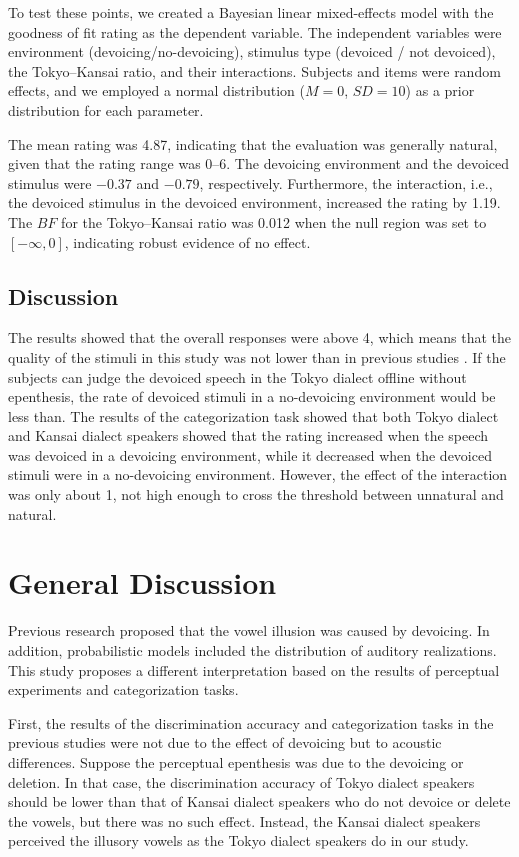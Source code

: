 \documentclass[a4paper,11pt,twocolumn]{article}
\begin{document}
To test these points, we created a Bayesian linear mixed-effects model with the goodness of fit rating as the dependent variable. The independent variables were environment (devoicing/no-devoicing), stimulus type (devoiced / not devoiced), the Tokyo--Kansai ratio, and their interactions. Subjects and items were random effects, and we employed a normal distribution ($M=0$, $SD=10$) as a prior distribution for each parameter.

The mean rating was 4.87, indicating that the evaluation was generally natural, given that the rating range was 0--6. The devoicing environment and the devoiced stimulus were $-0.37$ and $-0.79$, respectively. Furthermore, the interaction, i.e., the devoiced stimulus in the devoiced environment, increased the rating by 1.19. The $BF$ for the Tokyo--Kansai ratio was 0.012 when the null region was set to $[-\infty, 0]$, indicating robust evidence of no effect.

\subsection{Discussion}

The results showed that the overall responses were above 4, which means that the quality of the stimuli in this study was not lower than in previous studies \cite{kilpatrick2018japanese}. If the subjects can judge the devoiced speech in the Tokyo dialect offline without epenthesis, the rate of devoiced stimuli in a no-devoicing environment would be less than. The results of the categorization task showed that both Tokyo dialect and Kansai dialect speakers showed that the rating increased when the speech was devoiced in a devoicing environment, while it decreased when the devoiced stimuli were in a no-devoicing environment. However, the effect of the interaction was only about 1, not high enough to cross the threshold between unnatural and natural.

\section{General Discussion}

Previous research proposed that the vowel illusion was caused by devoicing. In addition, probabilistic models included the distribution of auditory realizations. This study proposes a different interpretation based on the results of perceptual experiments and categorization tasks.

First, the results of the discrimination accuracy and categorization tasks in the previous studies were not due to the effect of devoicing but to acoustic differences. Suppose the perceptual epenthesis was due to the devoicing or deletion. In that case, the discrimination accuracy of Tokyo dialect speakers should be lower than that of Kansai dialect speakers who do not devoice or delete the vowels, but there was no such effect. Instead, the Kansai dialect speakers perceived the illusory vowels as the Tokyo dialect speakers do in our study.
\end{document}

